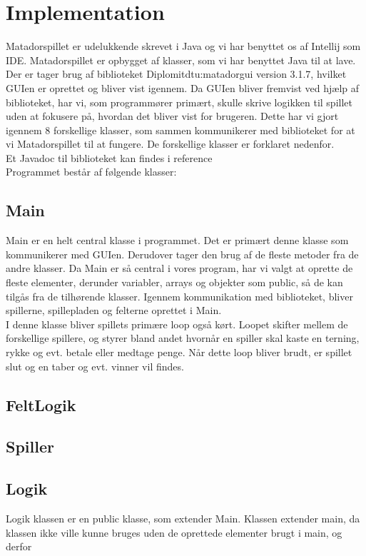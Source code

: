 \section{Implementation}
Matadorspillet er udelukkende skrevet i Java og vi har benyttet os af Intellij som IDE. Matadorspillet er opbygget af klasser, som vi har benyttet Java til at lave. \\
Der er tager brug af biblioteket Diplomitdtu:matadorgui version 3.1.7, hvilket GUIen er oprettet og bliver vist igennem. Da GUIen bliver fremvist ved hjælp af biblioteket, har vi, som programmører primært, skulle skrive logikken til spillet uden at fokusere på, hvordan det bliver vist for brugeren. Dette har vi gjort igennem 8 forskellige klasser, som sammen kommunikerer med biblioteket for at vi Matadorspillet til at fungere.
De forskellige klasser er forklaret nedenfor.\\
Et Javadoc til biblioteket kan findes i reference 
\\
Programmet består af følgende klasser:
\subsection{Main}
Main er en helt central klasse i programmet. Det er primært denne klasse som kommunikerer med GUIen. Derudover tager den brug af de fleste metoder fra de andre klasser. Da Main er så central i vores program, har vi valgt at oprette de fleste elementer, derunder variabler, arrays og objekter som public, så de kan tilgås fra de tilhørende klasser. Igennem kommunikation med biblioteket, bliver spillerne, spillepladen og felterne oprettet i Main.\\
I denne klasse bliver spillets primære loop også kørt. Loopet skifter mellem de forskellige spillere, og styrer bland andet hvornår en spiller skal kaste en terning, rykke og evt. betale eller medtage penge. Når dette loop bliver brudt, er spillet slut og en taber og evt. vinner vil findes.

\subsection{FeltLogik}
\subsection{Spiller}
\subsection{Logik}
Logik klassen er en public klasse, som extender Main. Klassen extender main, da klassen ikke ville kunne bruges uden de oprettede elementer brugt i main, og derfor 
